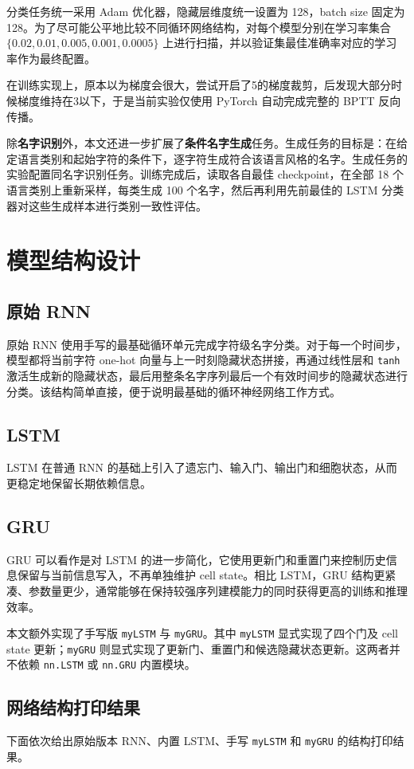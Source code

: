 \documentclass[a4paper]{article}
\begin{document}
分类任务统一采用 Adam 优化器，隐藏层维度统一设置为 128，batch size 固定为 128。为了尽可能公平地比较不同循环网络结构，对每个模型分别在学习率集合 $\{0.02, 0.01, 0.005, 0.001, 0.0005\}$ 上进行扫描，并以验证集最佳准确率对应的学习率作为最终配置。

在训练实现上，原本以为梯度会很大，尝试开启了5的梯度裁剪，后发现大部分时候梯度维持在3以下，于是当前实验仅使用 PyTorch 自动完成完整的 BPTT 反向传播。

除\textbf{名字识别}外，本文还进一步扩展了\textbf{条件名字生成}任务。生成任务的目标是：在给定语言类别和起始字符的条件下，逐字符生成符合该语言风格的名字。生成任务的实验配置同名字识别任务。训练完成后，读取各自最佳 checkpoint，在全部 18 个语言类别上重新采样，每类生成 100 个名字，然后再利用先前最佳的 LSTM 分类器对这些生成样本进行类别一致性评估。

\section{模型结构设计}
\subsection{原始 RNN}
原始 RNN 使用手写的最基础循环单元完成字符级名字分类。对于每一个时间步，模型都将当前字符 one-hot 向量与上一时刻隐藏状态拼接，再通过线性层和 \texttt{tanh} 激活生成新的隐藏状态，最后用整条名字序列最后一个有效时间步的隐藏状态进行分类。该结构简单直接，便于说明最基础的循环神经网络工作方式。

\subsection{LSTM}
LSTM 在普通 RNN 的基础上引入了遗忘门、输入门、输出门和细胞状态，从而更稳定地保留长期依赖信息。

\subsection{GRU}
GRU 可以看作是对 LSTM 的进一步简化，它使用更新门和重置门来控制历史信息保留与当前信息写入，不再单独维护 cell state。相比 LSTM，GRU 结构更紧凑、参数量更少，通常能够在保持较强序列建模能力的同时获得更高的训练和推理效率。

本文额外实现了手写版 \texttt{myLSTM} 与 \texttt{myGRU}。其中 \texttt{myLSTM} 显式实现了四个门及 cell state 更新；\texttt{myGRU} 则显式实现了更新门、重置门和候选隐藏状态更新。这两者并不依赖 \texttt{nn.LSTM} 或 \texttt{nn.GRU} 内置模块。

\subsection{网络结构打印结果}
下面依次给出原始版本 RNN、内置 LSTM、手写 \texttt{myLSTM} 和 \texttt{myGRU} 的结构打印结果。
\end{document}
